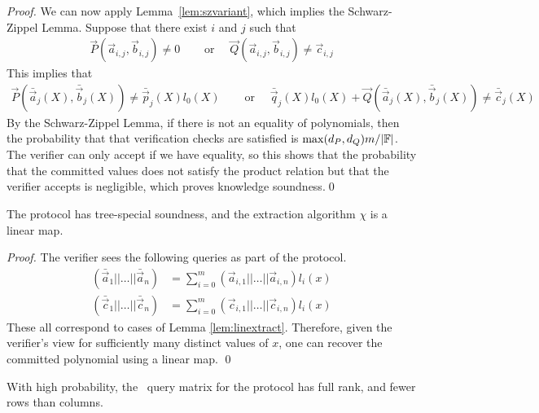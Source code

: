 \begin{proof}
We can now apply Lemma~\ref{lem:szvariant}, which implies the Schwarz-Zippel Lemma. Suppose that there exist $i$ and $j$ such that
\begin{align*}
\vec{P}(\vec{a}_{i,j},\vec{b}_{i,j}) \neq 0 & \quad \text{ or } \quad \vec{Q}(\vec{a}_{i,j},\vec{b}_{i,j}) \neq \vec{c}_{i,j}
\end{align*}
This implies that
\begin{align*}
\vec{P}(\bar{\vec{a}}_j(X),\bar{\vec{b}}_j(X)) \neq \bar{\vec{p}}_j(X)l_0(X) & \quad \text{ or } \quad \bar{\vec{q}}_j(X)l_0(X)+\vec{Q}(\bar{\vec{a}}_j(X),\bar{\vec{b}}_j(X)) \neq \bar{\vec{c}}_j(X)
\end{align*}
By the Schwarz-Zippel Lemma, if there is not an equality of polynomials, then the probability that that verification checks are satisfied is $\max (d_P,d_Q) m / |\mathbb{F}|$. The verifier can only accept if we have equality, so this shows that the probability that the committed values does not satisfy the product relation but that the verifier accepts is negligible, which proves knowledge soundness.\qed
\end{proof}

\begin{lemma}
The protocol has tree-special soundness, and the extraction algorithm $\chi$ is a linear map.
\end{lemma}

\begin{proof}
The verifier sees the following queries as part of the protocol.
\begin{align*}
(\bar{\vec{a}}_1||\ldots||\bar{\vec{a}}_n) &= \sum_{i=0}^m ( \vec{a}_{i,1}||\ldots||\vec{a}_{i,n}) {l_i(x)} \\
(\bar{\vec{c}}_1||\ldots||\bar{\vec{c}}_n) &= \sum_{i=0}^m ( \vec{c}_{i,1}||\ldots||\vec{c}_{i,n}) {l_i(x)}
\end{align*}
These all correspond to cases of Lemma \ref{lem:linextract}. Therefore, given the verifier's view for sufficiently many distinct values of $x$, one can recover the committed polynomial using a linear map. \qed
\end{proof}

\begin{lemma}
With high probability, the \ILC\ query matrix for the protocol has full rank, and fewer rows than columns.
\end{lemma}

